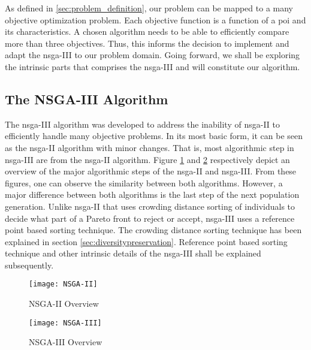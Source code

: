 As defined in \ref{sec:problem_definition}, our problem can be mapped to a many objective optimization problem. Each objective function is a function of a \gls{poi} and its characteristics. A chosen algorithm needs to be able to efficiently compare more than three objectives. Thus, this informs the decision to implement and adapt the \gls{nsga}-III to our problem domain. Going forward, we shall be exploring the intrinsic parts that comprises the \gls{nsga}-III and will constitute our algorithm.



\subsection{The NSGA-III Algorithm}
The \gls{nsga}-III algorithm was developed to address the inability of \gls{nsga}-II to efficiently handle many objective problems. In its most basic form, it can be seen as the \gls{nsga}-II algorithm with minor changes. That is, most algorithmic step in \gls{nsga}-III are from the \gls{nsga}-II algorithm. Figure \ref{fig:nsgaII} and \ref{fig:nsgaIII} respectively depict an overview of the major algorithmic steps of the \gls{nsga}-II and \gls{nsga}-III. From these figures, one can observe the similarity between both algorithms. However, a major difference between both algorithms is the last step of the next population generation. Unlike \gls{nsga}-II that uses crowding distance sorting of individuals to decide what part of a Pareto front to reject or accept, \gls{nsga}-III uses a reference point based sorting technique. The crowding distance sorting technique has been explained in section \ref{sec:diversitypreservation}. Reference point based sorting technique and other intrinsic details of the \gls{nsga}-III shall be explained subsequently.

\begin{figure}
    \centering
    \texttt{[image: NSGA-II]}
    \caption{NSGA-II Overview}
    \label{fig:nsgaII}
\end{figure}

\begin{figure}
    \centering
    \texttt{[image: NSGA-III]}
    \caption{NSGA-III Overview}
    \label{fig:nsgaIII}
\end{figure}

